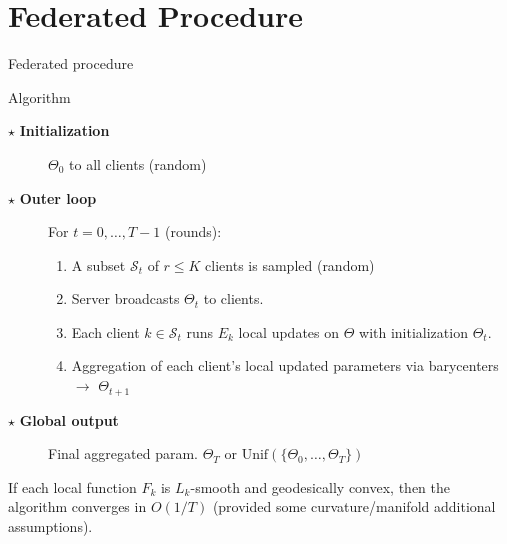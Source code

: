 \documentclass[aspectratio=169,xcolor=dvipsnames]{beamer}
\begin{document}
\section{Federated Procedure}

\begin{frame}{Federated procedure}
\begin{block}{Algorithm}
\begin{description}
    \item[$\star$ \textbf{Initialization}] $\Theta_{0}$ to all clients (random)
    \item[$\star$ \textbf{Outer loop}] For $t=0,\dots, T-1$ (rounds):
    \begin{enumerate}
        \item A subset $\mathcal{S}_t$ of $r\leq K$ clients is sampled (random)
        \item Server broadcasts $\Theta_{t}$ to clients.
        \item Each client $k\in \mathcal{S}_t$ runs $E_k$ local updates on $\Theta$ with initialization $\Theta_{t}$.
        \item Aggregation of each client's local updated parameters via barycenters $\to$ $\Theta_{t+1}$
    \end{enumerate}
    \item[$\star$ \textbf{Global output}] Final aggregated param. $\Theta_{T}$ or $\text{Unif}(\{\Theta_{0},\dots,\Theta_{T}\})$
\end{description}
\end{block}
\vspace{0.5cm}
If each local function $F_k$ is $L_k$-smooth and geodesically convex, then the algorithm converges in $O(1/T)$ (provided some curvature/manifold additional assumptions).
\end{frame}

\end{document}
